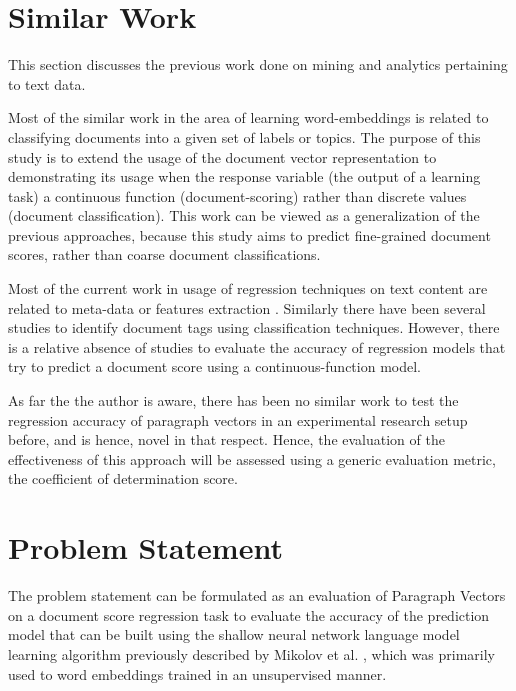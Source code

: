 \documentclass[conference]{IEEEtran}
\begin{document}
\vspace{5mm}

\section{Similar Work}
    This section discusses the previous work done on mining and analytics pertaining to text data.

    Most of the similar work in the area of learning word-embeddings is related to classifying documents into a given set of labels or topics. 
    The purpose of this study is to extend the usage of the document vector representation to demonstrating its usage when the response variable (the output of a learning task) a continuous function (document-scoring) rather than discrete values (document classification). 
    This work can be viewed as a generalization of the previous approaches, because this study aims to predict fine-grained document scores, rather than coarse document classifications.

    Most of the current work in usage of regression techniques on text content are related to meta-data or features extraction \cite{su2015genetic} \cite{weissman2016natural}.
    Similarly there have been several studies to identify document tags using classification techniques\cite{bespalov2011sentiment}\cite{pang2002thumbs}. 
    However, there is a relative absence of studies to evaluate the accuracy of regression models that try to predict a document score using a continuous-function model.

    As far the the author is aware, there has been no similar work to test the regression accuracy of paragraph vectors in an experimental research setup before, and is hence, novel in that respect.
    Hence, the evaluation of the effectiveness of this approach will be assessed using a generic evaluation metric, the coefficient of determination score.

\vspace{5mm}

\section{Problem Statement} \label{problem_statment}
    The problem statement can be formulated as an evaluation of Paragraph Vectors\cite{le2014distributed} on a document score regression task to evaluate the accuracy of the prediction model that can be built using the shallow neural network language model learning algorithm previously described by Mikolov et al. \cite{mikolov2013efficient}, which was primarily used to word embeddings trained in an unsupervised manner.
\end{document}
